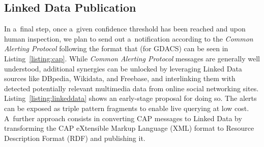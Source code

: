 \documentclass[letterpaper]{article}
\begin{document}
\subsection{Linked Data Publication}

In a~final step, once a~given confidence threshold has been reached
and upon human inspection, we plan to send out a~notification
according to the \emph{Common Alerting Protocol}
following the format that (for GDACS) can be seen in Listing~\ref{listing:cap}.
While \emph{Common Alerting Protocol} messages are generally well understood,
additional synergies can be unlocked by leveraging Linked Data sources
like DBpedia, Wikidata, and Freebase, and interlinking them with detected
potentially relevant multimedia data from online social networking sites.
Listing~\ref{listing:linkeddata} shows an early-stage proposal for doing so. 
The alerts can be exposed as triple pattern fragments
to enable live querying at low cost.
A~further approach consists in converting CAP messages to
Linked Data by transforming the CAP eXtensible Markup Language (XML) format
to Resource Description Format (RDF) and publishing it.
\end{document}
